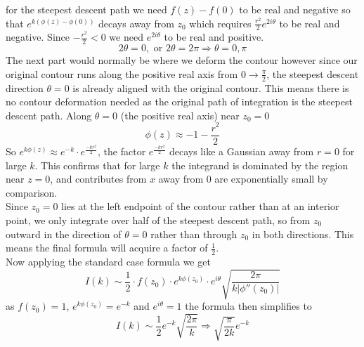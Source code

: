 for the steepest descent path we need $f(z)-f(0)$ to be real and negative so that $e^{k(\phi(z)-\phi(0))}$ decays away from $z_0$ which requires $\frac{r^2}{2}e^{2i\theta}$ to be real and negative. Since $-\frac{r^2}{2}<0$ we need $e^{2i\theta}$ to be real and positive.
$$2\theta=0, \text{ or } 2\theta=2\pi \Rightarrow \theta=0,\pi$$ 
The next part would normally be where we deform the contour however since our original contour runs along the positive real axis from $0\to\frac{\pi}{2}$, the steepest descent direction $\theta=0$ is already aligned with the original contour. This means there is no contour deformation needed as the original path of integration is the steepest descent path. 
Along $\theta=0$ (the positive real axis) near $z_0=0$ $$\phi(z)\approx-1-\frac{r^2}{2}$$ So $e^{k\phi(z)}\approx e^{-k}\cdot e^{\frac{-kr^2}{2}}$, the factor $e^{\frac{-kr^2}{2}}$ decays like a Gaussian away from $r=0$ for large $k$. This confirms that for large $k$ the integrand is dominated by the region near $z=0$, and contributes from $x$ away from $0$ are exponentially small by comparison. 
\\
Since $z_0=0$ lies at the left endpoint of the contour rather than at an interior point, we only integrate over half of the steepest descent path, so from $z_0$ outward in the direction of $\theta=0$ rather than through $z_0$ in both directions. This means the final formula will acquire a factor of $\frac{1}{2}$.
\\ 
Now applying the standard case formula we get $$I(k)\sim \frac{1}{2}\cdot f(z_0)\cdot e^{k\phi(z_0)}\cdot e^{i\theta}\sqrt{\frac{2\pi}{k|\phi''(z_0)|}}$$
as $f(z_0)=1$, $e^{k\phi(z_0)}=e^{-k}$ and $e^{i\theta}=1$ the formula then simplifies to 
$$I(k)\sim\frac{1}{2}e^{-k}\sqrt{\frac{2\pi}{k}}\Rightarrow\sqrt{\frac{\pi}{2k}}e^{-k}$$